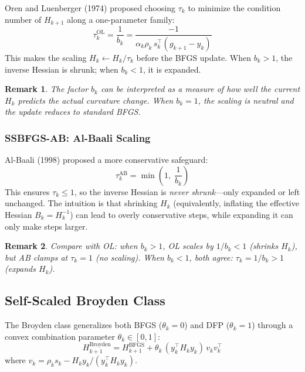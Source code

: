 \documentclass[11pt,a4paper]{article}
\newtheorem{remark}{Remark}[section]
\newcommand{\Hk}{H_k}
\newcommand{\Hkp}{H_{k+1}}
\newcommand{\sk}{s_k}
\newcommand{\yk}{y_k}
\newcommand{\tp}{\tau_k}
\newcommand{\thk}{\theta_k}
\begin{document}
Oren and Luenberger (1974) proposed choosing $\tp$ to minimize the
condition number of $\Hkp$ along a one-parameter family:
\begin{equation}
\boxed{
  \tp^{\text{OL}} = \frac{1}{b_k}
  = \frac{-1}{\alpha_k \rho_k \, \sk^\top(g_{k+1} - \yk)}
}
\label{eq:tau_ol}
\end{equation}
This makes the scaling $\Hk \gets \Hk / \tp$ before the BFGS update.
When $b_k > 1$, the inverse Hessian is shrunk; when $b_k < 1$, it is expanded.

\begin{remark}
The factor $b_k$ can be interpreted as a measure of how well the
current $\Hk$ predicts the actual curvature change.  When $b_k = 1$,
the scaling is neutral and the update reduces to standard BFGS.
\end{remark}

\subsubsection{SSBFGS-AB: Al-Baali Scaling}
\label{sec:ssbfgs_ab}

Al-Baali (1998) proposed a more conservative safeguard:
\begin{equation}
\boxed{
  \tp^{\text{AB}} = \min\!\left(1, \;\frac{1}{b_k}\right)
}
\label{eq:tau_ab}
\end{equation}
This ensures $\tp \leq 1$, so the inverse Hessian is \emph{never shrunk}---only expanded or left unchanged.  The intuition is that shrinking $\Hk$
(equivalently, inflating the effective Hessian $B_k = \Hk^{-1}$) can lead to
overly conservative steps, while expanding it can only make steps larger.

\begin{remark}
Compare with OL: when $b_k > 1$, OL scales by $1/b_k < 1$ (shrinks $\Hk$),
but AB clamps at $\tp = 1$ (no scaling).  When $b_k < 1$, both agree:
$\tp = 1/b_k > 1$ (expands $\Hk$).
\end{remark}

\subsection{Self-Scaled Broyden Class}
\label{sec:ssbroyden}

The Broyden class generalizes both BFGS ($\thk = 0$) and DFP ($\thk = 1$)
through a convex combination parameter $\thk \in [0, 1]$:
\begin{equation}
  \Hkp^{\text{Broyden}} = \Hkp^{\text{BFGS}} + \thk\,(\yk^\top \Hk \yk)\,v_k v_k^\top
  \label{eq:broyden_class}
\end{equation}
where $v_k = \rho_k \sk - \Hk \yk / (\yk^\top \Hk \yk)$.
\end{document}
